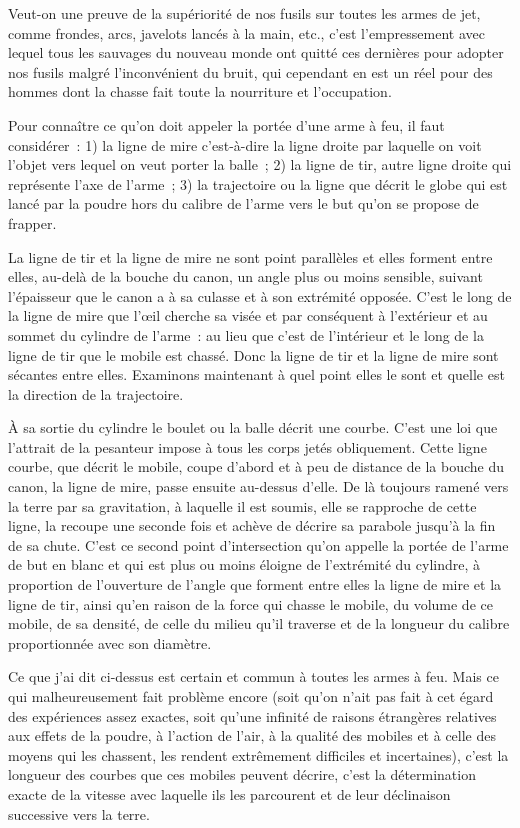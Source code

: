 \documentclass[french,twoside]{book} %
\begin{document}
Veut-on une preuve de la supériorité de nos fusils sur toutes les armes de jet, comme frondes, arcs, javelots lancés à la main, etc., c’est l’empressement avec lequel tous les sauvages du nouveau monde ont quitté ces dernières pour adopter nos fusils malgré l’inconvénient du bruit, qui cependant en est un réel pour des hommes dont la chasse fait toute la nourriture et l’occupation.\par
Pour connaître ce qu’on doit appeler la portée d’une arme à feu, il faut considérer : 1) la ligne de mire c’est-à-dire la ligne droite par laquelle on voit l’objet vers lequel on veut porter la balle ; 2) la ligne de tir, autre ligne droite qui représente l’axe de l’arme ; 3) la trajectoire ou la ligne que décrit le globe qui est lancé par la poudre hors du calibre de l’arme vers le but qu’on se propose de frapper.\par
La ligne de tir et la ligne de mire ne sont point parallèles et elles forment entre elles, au-delà de la bouche du canon, un angle plus ou moins sensible, suivant l’épaisseur que le canon a à sa culasse et à son extrémité opposée. C’est le long de la ligne de mire que l’œil cherche sa visée et par conséquent à l’extérieur et au sommet du cylindre de l’arme : au lieu que c’est de l’intérieur et le long de la ligne de tir que le mobile est chassé. Donc la ligne de tir et la ligne de mire sont sécantes entre elles. Examinons maintenant à quel point elles le sont et quelle est la direction de la trajectoire.\par
À sa sortie du cylindre le boulet ou la balle décrit une courbe. C’est une loi que l’attrait de la pesanteur impose à tous les corps jetés obliquement. Cette ligne courbe, que décrit le mobile, coupe d’abord et à peu de distance de la bouche du canon, la ligne de mire, passe ensuite au-dessus d’elle. De là toujours ramené vers la terre par sa gravitation, à laquelle il est soumis, elle se rapproche de cette ligne, la recoupe une seconde fois et achève de décrire sa parabole jusqu’à la fin de sa chute. C’est ce second point d’intersection qu’on appelle la portée de l’arme de but en blanc et qui est plus ou moins éloigne de l’extrémité du cylindre, à proportion de l’ouverture de l’angle que forment entre elles la ligne de mire et la ligne de tir, ainsi qu’en raison de la force qui chasse le mobile, du volume de ce mobile, de sa densité, de celle du milieu qu’il traverse et de la longueur du calibre proportionnée avec son diamètre.\par
Ce que j’ai dit ci-dessus est certain et commun à toutes les armes à feu. Mais ce qui malheureusement fait problème encore (soit qu’on n’ait pas fait à cet égard des expériences assez exactes, soit qu’une infinité de raisons étrangères relatives aux effets de la poudre, à l’action de l’air, à la qualité des mobiles et à celle des moyens qui les chassent, les rendent extrêmement difficiles et incertaines), c’est la longueur des courbes que ces mobiles peuvent décrire, c’est la détermination exacte de la vitesse avec laquelle ils les parcourent et de leur déclinaison successive vers la terre.\par
\end{document}
